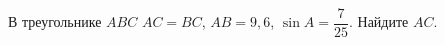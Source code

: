\begin{ex}
	\begin{condition}
		В треугольнике \(ABC\) \( AC=BC \), \(AB=9,6\),  \( \sin A=\dfrac{7}{25} \).  Найдите \( AC \).
	\end{condition}
\end{ex}